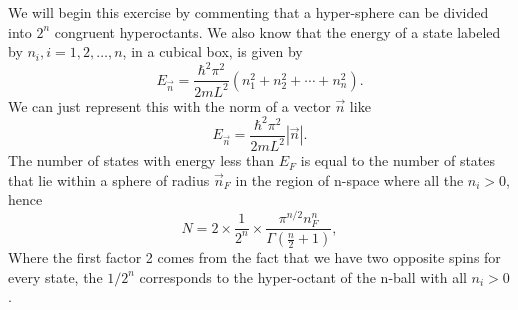 \begin{questions}
\begin{solution}
 \end{solution}


 \begin{solution}
   We will begin this exercise by commenting that a hyper-sphere can be divided into $2^n$ congruent hyperoctants. We also know that the energy of a state labeled by $n_i, i=1,2,\ldots,n$, in a cubical box, is given by
   \begin{equation}
     E_{\vec{n}} = \frac{\hbar^2\pi^2}{2mL^2}(n_1^2+n_2^2+\cdots+n_n^2).
   \end{equation}
   We can just represent this with the norm of a vector $\vec{n}$ like
   \begin{equation}
     E_{\vec{n}} = \frac{\hbar^2\pi^2}{2mL^2}|\vec{n}|.
     \label{ene}
   \end{equation}
   The number of states with energy less than $E_F$ is equal to the number of states that lie within a sphere of radius $\vec{n}_F$ in the region of n-space where all the $n_i>0$, hence
   \begin{equation}
     N = 2\times \frac{1}{2^n}\times \frac{\pi^{n/2}n_F^n}{\Gamma \left(\frac{n}{2} + 1 \right)},
   \end{equation}
   Where the first factor 2 comes from the fact that we have two opposite spins for every state, the $1/2^n$ corresponds to the hyper-octant of the n-ball with all $n_i>0$.


\end{solution}
\end{questions}

